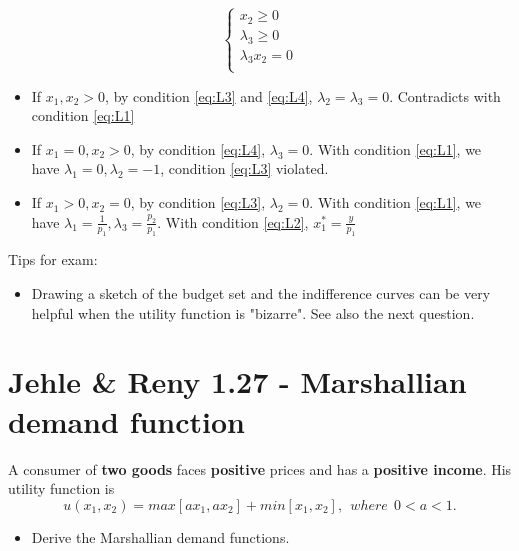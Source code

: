 \documentclass{article}
\begin{document}
\begin{mdframed}[backgroundcolor=blue!20,linecolor=white]
\begin{equation}
  \begin{cases}
    x_2 \ge 0 \\
    \lambda_3 \ge 0 \\
    \lambda_3 x_2 =0 \\
  \end{cases}
   \label{eq:L4}
\end{equation}

\begin{itemize}
\item If $x_1,x_2>0$, by condition \ref{eq:L3} and \ref{eq:L4}, $\lambda_2 = \lambda_3 =0$.
Contradicts with condition \ref{eq:L1}

\item If $x_1=0,x_2>0$, by condition \ref{eq:L4}, $\lambda_3 =0$.
With condition \ref{eq:L1}, we have $\lambda_1 =0, \lambda_2 = -1$, condition \ref{eq:L3} violated.

\item If $x_1>0,x_2=0$, by condition \ref{eq:L3}, $\lambda_2 =0$.
With condition \ref{eq:L1}, we have $\lambda_1 =\frac{1}{p_1}, \lambda_3 = \frac{p_2}{p_1}$.
With condition \ref{eq:L2}, $x_1^* = \frac{y}{p_1}$
\end{itemize}
\end{mdframed}

\begin{mdframed}[backgroundcolor=yellow!20,linecolor=white]
Tips for exam:
\begin{itemize}

\item Drawing a sketch of the budget set and the indifference curves can be very helpful when the utility 
function is "bizarre". See also the next question.

\end{itemize}

\end{mdframed}

\section{Jehle \& Reny 1.27 - Marshallian  demand function}

A consumer of \textbf{two goods} faces \textbf{positive} prices and has a \textbf{positive income}. 
His utility function is $$u(x_1, x_2) = max[ax_1, ax_2] + min[x_1, x_2], \ \ where \ \ 0 < a < 1.$$
\begin{itemize}
\item Derive the Marshallian demand functions.
\end{itemize}
\end{document}
